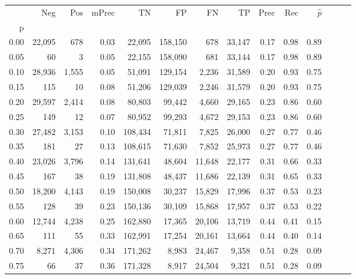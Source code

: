 \begin{tabular}{rrrrrrrrrrrrrr}
\toprule
{} &     Neg &    Pos & mPrec &       TN &       FP &      FN &      TP &  Prec &   Rec & $\hat{p}$ \\
p    &         &        &       &          &          &         &         &       &       &           \\
\midrule
0.00 &  22,095 &    678 &  0.03 &   22,095 &  158,150 &     678 &  33,147 &  0.17 &  0.98 &      0.89 \\
0.05 &      60 &      3 &  0.05 &   22,155 &  158,090 &     681 &  33,144 &  0.17 &  0.98 &      0.89 \\
0.10 &  28,936 &  1,555 &  0.05 &   51,091 &  129,154 &   2,236 &  31,589 &  0.20 &  0.93 &      0.75 \\
0.15 &     115 &     10 &  0.08 &   51,206 &  129,039 &   2,246 &  31,579 &  0.20 &  0.93 &      0.75 \\
0.20 &  29,597 &  2,414 &  0.08 &   80,803 &   99,442 &   4,660 &  29,165 &  0.23 &  0.86 &      0.60 \\
0.25 &     149 &     12 &  0.07 &   80,952 &   99,293 &   4,672 &  29,153 &  0.23 &  0.86 &      0.60 \\
0.30 &  27,482 &  3,153 &  0.10 &  108,434 &   71,811 &   7,825 &  26,000 &  0.27 &  0.77 &      0.46 \\
0.35 &     181 &     27 &  0.13 &  108,615 &   71,630 &   7,852 &  25,973 &  0.27 &  0.77 &      0.46 \\
0.40 &  23,026 &  3,796 &  0.14 &  131,641 &   48,604 &  11,648 &  22,177 &  0.31 &  0.66 &      0.33 \\
0.45 &     167 &     38 &  0.19 &  131,808 &   48,437 &  11,686 &  22,139 &  0.31 &  0.65 &      0.33 \\
0.50 &  18,200 &  4,143 &  0.19 &  150,008 &   30,237 &  15,829 &  17,996 &  0.37 &  0.53 &      0.23 \\
0.55 &     128 &     39 &  0.23 &  150,136 &   30,109 &  15,868 &  17,957 &  0.37 &  0.53 &      0.22 \\
0.60 &  12,744 &  4,238 &  0.25 &  162,880 &   17,365 &  20,106 &  13,719 &  0.44 &  0.41 &      0.15 \\
0.65 &     111 &     55 &  0.33 &  162,991 &   17,254 &  20,161 &  13,664 &  0.44 &  0.40 &      0.14 \\
0.70 &   8,271 &  4,306 &  0.34 &  171,262 &    8,983 &  24,467 &   9,358 &  0.51 &  0.28 &      0.09 \\
0.75 &      66 &     37 &  0.36 &  171,328 &    8,917 &  24,504 &   9,321 &  0.51 &  0.28 &      0.09 \\

\end{tabular}
